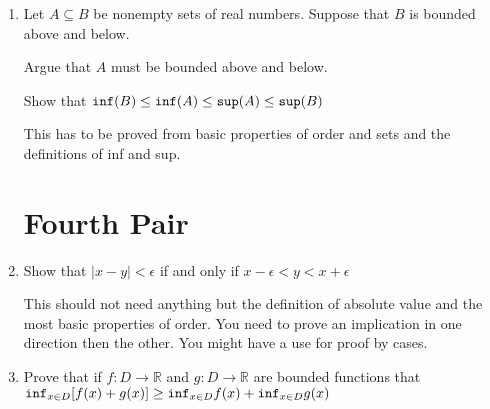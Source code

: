 \documentclass[12pt]{article}
\begin{document}
\begin{enumerate}
\newpage

\item 

Let $A \subseteq B$ be nonempty sets of real numbers.  Suppose that $B$ is bounded above and below.  

Argue that $A$ must be bounded above and below.

Show that ${\tt inf}(B) \leq {\tt inf}(A) \leq {\tt sup}(A) \leq {\tt sup}(B)$

This has to be proved from basic properties of order and sets and the definitions of inf and sup.

\newpage

\section{Fourth Pair}

\item  Show that $|x-y|<\epsilon$ if and only if $x-\epsilon < y < x+\epsilon$

This should not need anything but the definition of absolute value and the most basic properties of order.  You need to prove an implication in one direction then the other.  You might have a use for proof by cases.

\newpage

\item  Prove that if $f:D \rightarrow \mathbb R$ and $g:D \rightarrow \mathbb R$ are bounded functions that
${\tt inf}_{x \in D}[f(x)+g(x)] \geq {\tt inf}_{x \in D}f(x) + {\tt inf}_{x \in D}g(x)$

\newpage

\end{enumerate}
\end{document}
